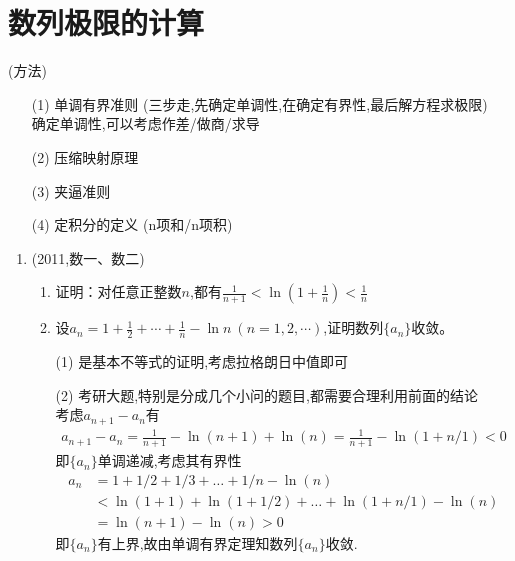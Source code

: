 \documentclass[12pt, a4paper, oneside, UTF8]{ctexbook}
\begin{document}
\section{数列极限的计算}
\begin{remark}(方法)
    \begin{enumerate}
        \item [(1)] 单调有界准则 (三步走,先确定单调性,在确定有界性,最后解方程求极限) \\
        确定单调性,可以考虑作差/做商/求导
        \item [(2)] 压缩映射原理
        \item [(3)] 夹逼准则
        \item [(4)] 定积分的定义 (n项和/n项积)
    \end{enumerate}
\end{remark}
\begin{enumerate}[label=\arabic*.,start=15]
    \item  (2011,数一、数二)
    \begin{enumerate}[label=(\roman*)]
        \item 证明：对任意正整数$n$,都有$\frac{1}{n+1}<\ln\left(1+\frac{1}{n}\right)<\frac{1}{n}$
        \item 设$a_n=1+\frac{1}{2}+\cdots+\frac{1}{n}-\ln n\ (n=1,2,\cdots)$,证明数列$\{a_n\}$收敛。
    \end{enumerate}
    
    \begin{solution}
    \begin{enumerate}
        \item [(1)] 是基本不等式的证明,考虑拉格朗日中值即可
        \item [(2)] 考研大题,特别是分成几个小问的题目,都需要合理利用前面的结论 \\
        考虑$a_{n+1}-a_{n}$有 
        \begin{align*}
            a_{n+1}-a_{n}=\frac{1}{n+1}-\ln(n+1)+\ln(n) = \frac{1}{n+1}-\ln(1+n/1) < 0
        \end{align*}
        即$\{a_n\}$单调递减,考虑其有界性
        \begin{align*}
            a_n &= 1 + 1/2 + 1/3 +\ldots + 1/n - \ln(n) \\
            & < \ln(1+1) + \ln(1+1/2) + \ldots + \ln(1+n/1) - \ln(n) \\
            & =  \ln (n+1) - \ln(n) > 0 
        \end{align*}
        即$\{a_n\}$有上界,故由单调有界定理知数列$\{a_n\}$收敛.
    \end{enumerate}
    \end{solution}
    

\end{enumerate}
\end{document}
